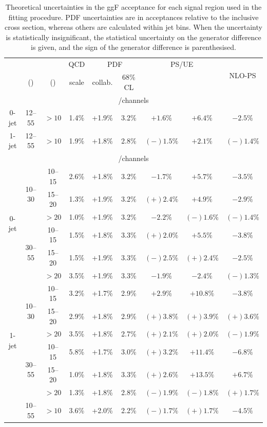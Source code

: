 \begin{table}[p]
	\centering
	\begin{tabular}{ccc|cccccc}
		\toprule
		& \mll & \ptsubleadlep & QCD & \multicolumn{2}{c}{PDF} & \multicolumn{2}{c}{PS/UE} & \multirow{2}{*}{NLO-PS} \\
		& (\GeV) & (\GeV) & scale & collab. & 68\% CL & \pythia{6} & \fherwig & \\
		\midrule
		\multicolumn{9}{c}{\eech/\mmch channels} \\
		\midrule
		0-jet & 12--55 & $>10$ & 1.4\% & +1.9\% & 3.2\% &   $+1.6\%$ & $+6.4\%$ &   $-2.5\%$ \\
		1-jet & 12--55 & $>10$ & 1.9\% & +1.8\% & 2.8\% & $(-)1.5\%$ & $+2.1\%$ & $(-)1.4\%$ \\
		\midrule
		\multicolumn{9}{c}{\emch/\mech channels} \\
		\midrule
		\multirow{6}{*}{0-jet}
		& \multirow{3}{*}{10--30}
	    &  10--15 & 2.6\% & +1.8\% & 3.2\% &   $-1.7\%$ &   $+5.7\%$ &   $-3.5\%$ \\
		&& 15--20 & 1.3\% & +1.9\% & 3.2\% & $(+)2.4\%$ &   $+4.9\%$ &   $-2.9\%$ \\
		&&  $>20$ & 1.0\% & +1.9\% & 3.2\% &   $-2.2\%$ & $(-)1.6\%$ & $(-)1.4\%$ \\
		\cmidrule(lr){2-9}
		& \multirow{3}{*}{30--55}
		&  10--15 & 1.5\% & +1.8\% & 3.3\% & $(+)2.0\%$ &   $+5.5\%$ &   $-3.8\%$ \\
		&& 15--20 & 1.5\% & +1.9\% & 3.3\% & $(-)2.5\%$ & $(+)2.4\%$ &   $-2.5\%$ \\
		&&  $>20$ & 3.5\% & +1.9\% & 3.3\% &   $-1.9\%$ &   $-2.4\%$ & $(-)1.3\%$ \\
		\cmidrule(lr){1-9}
		\multirow{6}{*}{1-jet}
		& \multirow{3}{*}{10--30}
	    &  10--15 & 3.2\% & +1.7\% & 2.9\% &   $+2.9\%$ &  $+10.8\%$ &   $-3.8\%$ \\
		&& 15--20 & 2.9\% & +1.8\% & 2.9\% & $(+)3.8\%$ & $(+)3.9\%$ & $(+)3.6\%$ \\
		&&  $>20$ & 3.5\% & +1.8\% & 2.7\% & $(+)2.1\%$ & $(+)2.0\%$ & $(-)1.9\%$ \\
		\cmidrule(lr){2-9}
		& \multirow{3}{*}{30--55}
		&  10--15 & 5.8\% & +1.7\% & 3.0\% & $(+)3.2\%$ &  $+11.4\%$ &   $-6.8\%$ \\
		&& 15--20 & 1.0\% & +1.8\% & 3.3\% & $(+)2.6\%$ &  $+13.5\%$ &   $+6.7\%$ \\
		&&  $>20$ & 1.3\% & +1.8\% & 2.8\% & $(-)1.9\%$ & $(-)1.8\%$ & $(+)1.7\%$ \\
		\cmidrule(lr){1-9}
		\twojet & 10--55 & $>10$ & 3.6\% & +2.0\% & 2.2\% & $(-)1.7\%$ & $(+)1.7\%$ & $-4.5\%$ \\
		\bottomrule
	\end{tabular}
	\caption{Theoretical uncertainties in the ggF acceptance for each signal region used 
	in the fitting procedure. PDF uncertainties are in acceptances relative to the 
	inclusive cross section, whereas others are calculated within jet bins. When the 
	uncertainty is statistically insignificant, the statistical uncertainty on the 
	generator difference is given, and the sign of the generator difference is 
	parenthesised.}
	\label{tab:signal:acc_unc}
\end{table}



